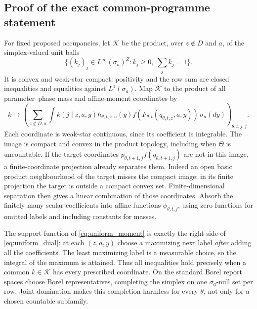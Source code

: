 \subsection{Proof of the exact common-programme statement}
For fixed proposed occupancies, let $\mathscr K$ be the product, over $z\notin D$ and $a$, of the simplex-valued unit balls
\[
 \{(k_j)_j\in L^\infty(\sigma_a)^Z:k_j\ge0,\ \sum_j k_j=1\}.
\]
It is convex and weak-star compact: positivity and the row sum are closed inequalities and equalities against $L^1(\sigma_a)$. Map $\mathscr K$ to the product of all parameter--phase mass and affine-moment coordinates by
\begin{equation}\label{eq:uniform_moment}
 k\longmapsto\left(
   \sum_{z\notin D,a}\int k(j\mid z,a,y)h_{\theta,t,z,a}(y)
     f(F_{\theta,t}(q_{\theta,t,z},a,y))\,\sigma_a(dy)
                          \right)_{\theta,t,j,f}.
\end{equation}
Each coordinate is weak-star continuous, since its coefficient is integrable. The image is compact and convex in the product topology, including when $\Theta$ is uncountable. If the target coordinates
$p_{\theta,t+1,j}f(q_{\theta,t+1,j})$ are not in this image, a finite-coordinate projection already separates them. Indeed an open basic product neighbourhood of the target misses the compact image; in its finite projection the target is outside a compact convex set. Finite-dimensional separation then gives a linear combination of those coordinates. Absorb the finitely many scalar coefficients into affine functions $\phi_{\theta,t,j}$, using zero functions for omitted labels and including constants for masses.

The support function of \eqref{eq:uniform_moment} is exactly the right side of \eqref{eq:uniform_dual}: at each $(z,a,y)$ choose a maximizing next label \emph{after} adding all the coefficients. The least maximizing label is a measurable choice, so the integral of the maximum is attained. Thus all inequalities hold precisely when a common $k\in\mathscr K$ has every prescribed coordinate. On the standard Borel report spaces choose Borel representatives, completing the simplex on one $\sigma_a$-null set per row. Joint domination makes this completion harmless for every $\theta$, not only for a chosen countable subfamily.

